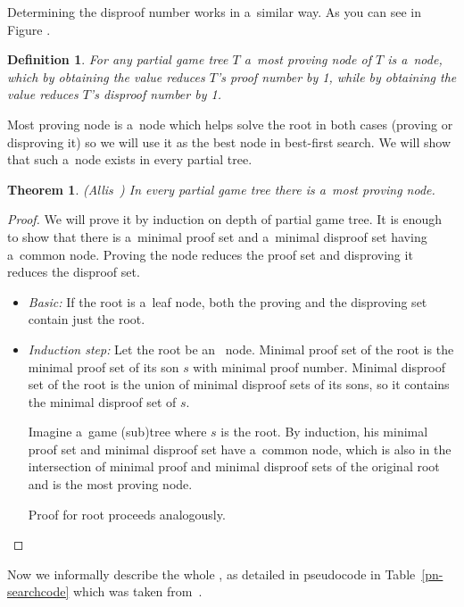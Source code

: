 Determining the disproof number works in a~similar way. As you can see in
Figure . 

\newtheorem*{mostProvingNode}{Definition}	
\begin{mostProvingNode}
	For any partial game tree $T$ a~{\sl most proving node} of $T$ is a~node, which by 
	obtaining the value  reduces $T$'s proof number by 1, while by obtaining the
	value  reduces $T$'s disproof number by 1.
\end{mostProvingNode}

Most proving node is a~node which helps solve the root in both cases (proving
or disproving it) so we will use it as the best node in best-first search. We
will show that such a~node exists in every partial tree.

\newtheorem{mpnExist}{Theorem}
\begin{mpnExist}
	(Allis~\cite{allis}) In every partial game tree there is a~most proving node.
\end{mpnExist}

\begin{proof}

	We will prove it by induction on depth of partial game tree.
	It is enough to show that there is a~minimal proof set and a~minimal disproof set having 
	a~common node. Proving the node reduces the proof set and disproving it reduces the
	disproof set.

	\begin{itemize} 
		\item \textit{Basic:} 
			If the root is a~leaf node, both the proving and the disproving set 
			contain just the root.
		\item \textit{Induction step:}
			Let the root be an~ node. Minimal proof set of the root is the minimal proof set
			of its son $s$ with minimal proof number. Minimal disproof set of the root
			is the union of minimal disproof sets of its sons, so it contains
			the minimal disproof set of $s$.

			Imagine a~game (sub)tree where $s$ is the root. By induction, his
			minimal proof set and minimal disproof set have a~common node, which is also 
			in the intersection of minimal proof and minimal disproof sets of the original root and
			is the most proving node.

			Proof for  root proceeds analogously.
	\end{itemize}
\end{proof}

Now we informally describe the whole , as detailed in pseudocode in
Table~\ref{pn-searchcode} which was taken from~\cite{allis}.

